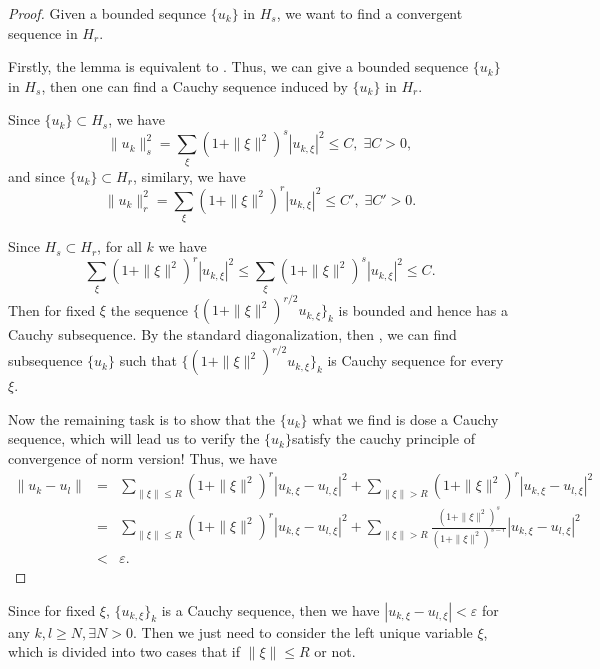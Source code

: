 \documentclass[twoside,openany,12pt]{beautynote}
\newcommand{\tmcolor}[2]{{\color{#1}{#2}}}
\begin{document}
\begin{proof}
  Given a bounded sequnce $\{ u_k \}$ in $H_s$, we want to find a convergent
  sequence in $H_r$.
  
  Firstly, the lemma is equivalent to \tmcolor{red}{the limit of every Cauchy
  sequence of $H_r$ is in $H_r$}. Thus, we can give a bounded sequence $\{ u_k
  \} $in $H_s$, then one can find a Cauchy sequence induced by $\{ u_k \}$ in
  $H_r$.
  
  Since $\{ u_k \} \subset H_s$, we have
  \[ \|u_k \|_s^2 = \sum_{\xi} (1 +\| \xi \|^2)^s | u_{k, \xi} |^2 \leqslant
     C, \; \exists C > 0, \]
  and since $\{ u_k \} \subset H_r$, similary, we have
  \[ \|u_k \|_r^2 = \sum_{\xi} (1 +\| \xi \|^2)^r | u_{k, \xi} |^2 \leqslant
     C', \; \exists C' > 0. \]
  
  
  Since $H_s \subset H_r$, for all $k$ we have
  \[ \sum_{\xi} (1 +\| \xi \|^2)^r | u_{k, \xi} |^2 \leqslant \sum_{\xi} (1
     +\| \xi \|^2)^s | u_{k, \xi} |^2 \leqslant C. \]
  Then for fixed $\xi$ the sequence $\{ (1 +\| \xi \|^2)^{r / 2} u_{k, \xi}
  \}_k$ is bounded and hence has a Cauchy subsequence. {\color[HTML]{B5005A}By
  the standard diagonalization}, then , we can {\color[HTML]{B4005A}find
  subsequence $\{ u_k \}$ such that $\{ (1 +\| \xi \|^2)^{r / 2} u_{k, \xi}
  \}_k$ is Cauchy sequence for every $\xi$.}
  
  Now the remaining task is to show that the $\{ u_k \}$ what we find is dose
  a Cauchy sequence, which will lead us to verify the $\{ u_k \}$satisfy the
  cauchy principle of convergence of norm version! Thus, we have
  \begin{eqnarray}
    \|u_k - u_l \| & = & \sum_{\| \xi \| \leqslant R} (1 +\| \xi \|^2)^r |
    u_{k, \xi} - u_{l, \xi} |^2 + \sum_{\| \xi \|> R} (1 +\| \xi \|^2)^r |
    u_{k, \xi} - u_{l, \xi} |^2 \nonumber\\
    & = & \sum_{\| \xi \| \leqslant R} (1 +\| \xi \|^2)^r | u_{k, \xi} -
    u_{l, \xi} |^2 + \sum_{\| \xi \|> R} \frac{(1 +\| \xi \|^2)^s }{(1 +\| \xi
    \|^2)^{s - r}} | u_{k, \xi} - u_{l, \xi} |^2 \nonumber\\
    & < & \varepsilon . \nonumber
  \end{eqnarray}
  
\end{proof}

\begin{remark}
  Since for fixed $\xi$, $\{ u_{k, \xi} \}_k$ is a Cauchy sequence, then we
  have $| u_{k, \xi} - u_{l, \xi} |  < \varepsilon$ for any $k, l \geqslant N,
  \exists N > 0$. Then we just need to consider the left unique variable
  $\xi$, which is divided into two cases that if  $\| \xi \| \leqslant R$ or
  not.
\end{remark}
\end{document}
